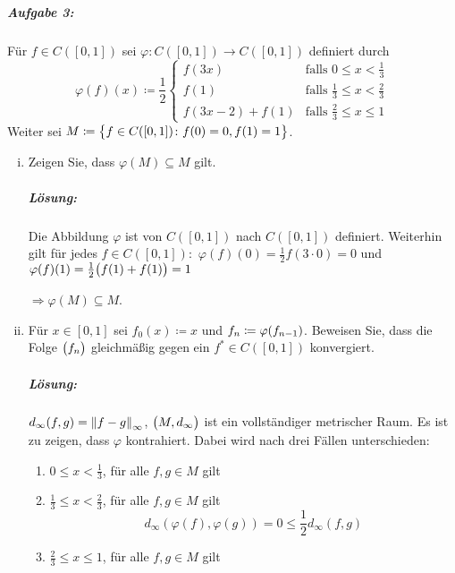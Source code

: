 \documentclass{scrreprt}
\begin{document}
\subparagraph{Aufgabe 3:} Für $f \in C([0, 1])$ sei
$\varphi \colon C([0, 1]) \to C([0, 1])$ definiert durch
\[
  \varphi(f)(x) \coloneqq \frac{1}{2} \begin{cases}
    f(3x) & \text{falls } 0 \leq x < \frac{1}{3} \\
    f(1) & \text{falls } \frac{1}{3} \leq x < \frac{2}{3} \\
    f(3x - 2) + f(1) & \text{falls } \frac{2}{3} \leq x \leq 1
  \end{cases}
\]
Weiter sei $M \coloneqq \qty\big{f \in C([0, 1]) \colon f(0) = 0, f(1) = 1}$.
\begin{enumerate}[(i)]
\item Zeigen Sie, dass $\varphi(M) \subseteq M$ gilt.

  \subparagraph{Lösung:} Die Abbildung $\varphi$ ist von $C([0, 1])$
  nach $C([0, 1])$ definiert.
  Weiterhin gilt für jedes $f \in C([0, 1]) \colon$
  $\varphi(f)(0) = \frac{1}{2} f(3 \cdot 0) = 0$ und
  $\varphi(f)(1) = \frac{1}{2} \qty\big(f(1) + f(1)) = 1$

  $\Rightarrow \varphi(M) \subseteq M$.

\newpage
\item Für $x \in [0, 1]$ sei $f_0(x) \coloneqq x$ und
  $f_n \coloneqq \varphi\qty(f_{n - 1})$.
  Beweisen Sie, dass die Folge $\qty\big(f_n)$ gleichmäßig gegen ein
  $f^* \in C([0, 1])$ konvergiert.

  \subparagraph{Lösung:} $d_{\infty}(f, g) = \norm{f - g}_{\infty}$,
  $\qty\big(M, d_{\infty})$ ist ein vollständiger metrischer Raum.
  Es ist zu zeigen, dass $\varphi$ kontrahiert.
  Dabei wird nach drei Fällen unterschieden:
  \begin{enumerate}[label={Fall \arabic*:}]
  \item $0 \leq x < \frac{1}{3}$, für alle $f, g \in M$ gilt
    \begin{flalign*}
      d_{\infty}(\varphi(f), \varphi(g))
      &= \sup_{x \in \left[0, \right)}   & \\
      &\leq {}
      \sup _{x \in \qty[0, 1]} \abs{f(x) - g(x)}
      = \frac{1}{2} d_{\infty}(f, g)
    \end{flalign*}

  \item $\frac{1}{3} \leq x < \frac{2}{3}$, für alle $f, g \in M$ gilt
    \[
      d_{\infty} (\varphi(f), \varphi(g)) = 0 \leq \frac{1}{2} d_{\infty}(f, g)
    \]

  \item $\frac{2}{3} \leq x \leq 1$, für alle $f, g \in M$ gilt
  \end{enumerate}


\end{enumerate}
\end{document}
